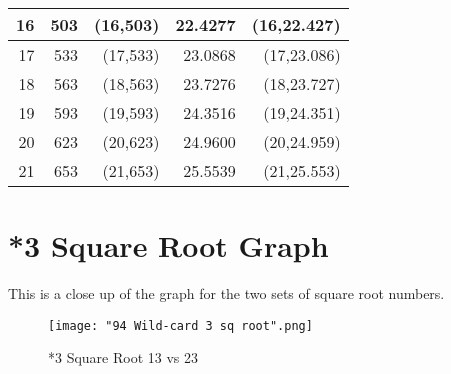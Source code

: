 \documentclass[12pt,letterpaper,oneside,titlepage]{article}
\begin{document}
\begin{tabular}{|r|r|r|r|r|}
\hline    16    & 503          &   (16,503)     &   22.4277       &  (16,22.427)   \\
\hline    17    & 533          &   (17,533)     &   23.0868       &  (17,23.086)   \\
\hline    18    & 563          &   (18,563)     &   23.7276       &  (18,23.727)   \\
\hline    19    & 593          &   (19,593)     &   24.3516       &  (19,24.351)   \\
\hline    20    & 623          &   (20,623)     &   24.9600       &  (20,24.959)   \\
\hline    21    & 653          &   (21,653)     &   25.5539       &  (21,25.553)   \\

	\hline 
\end{tabular} 

\pagebreak 
\section{*3 Square Root Graph}
\par This is a close up of the graph for the two sets of square root numbers.
\begin{figure}[h]
	\centering
	\texttt{[image: "94 Wild-card 3 sq root".png]}
	\caption{*3 Square Root 13 vs 23}
\end{figure}
\pagebreak  
\pagebreak 
\end{document}
